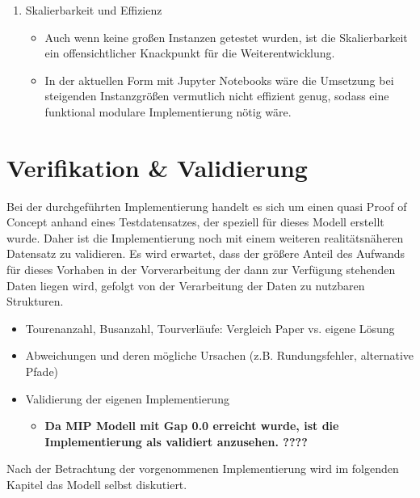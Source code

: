 \begin{enumerate}
    \item Skalierbarkeit und Effizienz
   \begin{itemize}
    \item Auch wenn keine großen Instanzen getestet wurden, ist die Skalierbarkeit ein offensichtlicher Knackpunkt für die Weiterentwicklung.
    \item In der aktuellen Form mit Jupyter Notebooks wäre die Umsetzung bei steigenden Instanzgrößen vermutlich nicht effizient genug, sodass eine funktional modulare Implementierung nötig wäre.
   \end{itemize} 
    
 \end{enumerate}

\section{Verifikation \& Validierung}
Bei der durchgeführten Implementierung handelt es sich um einen quasi Proof of Concept anhand eines Testdatensatzes, der speziell für dieses Modell erstellt wurde. Daher ist die Implementierung noch mit einem weiteren realitätsnäheren Datensatz zu validieren. Es wird erwartet, dass der größere Anteil des Aufwands für dieses Vorhaben in der Vorverarbeitung der dann zur Verfügung stehenden Daten liegen wird, gefolgt von der Verarbeitung der Daten zu nutzbaren Strukturen.

\begin{itemize}
\item Tourenanzahl, Busanzahl, Tourverläufe: Vergleich Paper vs. eigene Lösung
\item Abweichungen und deren mögliche Ursachen (z.B. Rundungsfehler, alternative Pfade)
\item Validierung der eigenen Implementierung
\begin{itemize}
    \item \textbf{ Da MIP Modell mit Gap 0.0 erreicht wurde, ist die Implementierung als validiert anzusehen. ????}
\end{itemize}
\end{itemize}

Nach der Betrachtung der vorgenommenen Implementierung wird im folgenden Kapitel das Modell selbst diskutiert. 